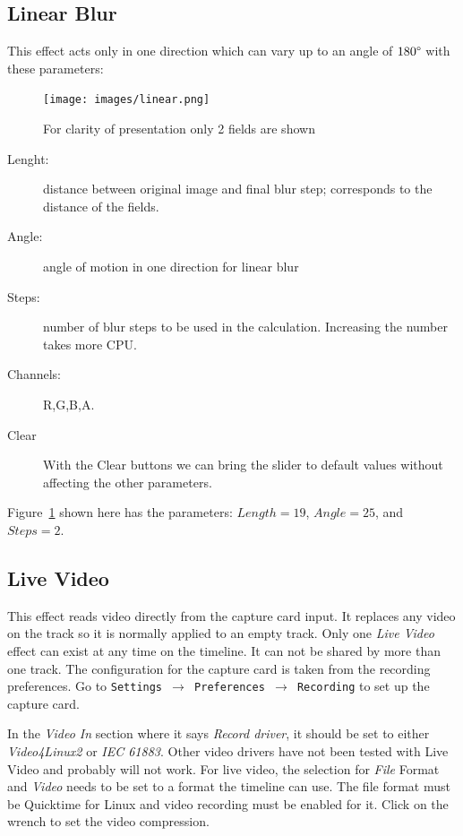 \subsection{Linear Blur}%
\label{sub:linear_blur}

This effect acts only in one direction which can vary up to an angle of $180\degree$ with these parameters:

\begin{figure}[htpb]
	\centering
	\texttt{[image: images/linear.png]}
	\caption{For clarity of presentation only 2 fields are shown}
	\label{fig:linear}
\end{figure}

\begin{description}
    \item[Lenght:] distance between original image and final blur step; corresponds to the distance of the fields.
    \item[Angle:] angle of motion in one direction for linear blur
    \item[Steps:] number of blur steps to be used in the calculation. Increasing the number takes more CPU.
    \item[Channels:] R,G,B,A.
    \item[Clear] With the Clear buttons we can bring the slider to default values without affecting the other parameters.
\end{description}

Figure~\ref{fig:linear} shown here has the parameters: $Length=19$, $Angle=25$, and $Steps=2$.

\subsection{Live Video}%
\label{sub:live_video}

This effect reads video directly from the capture card input. It replaces any video on the track so it is normally applied to an empty track. Only one \textit{Live Video} effect can exist at any time on the timeline. It can not be shared by more than one track. The configuration for the capture card is taken from the recording preferences. Go to \texttt{Settings $\rightarrow$ Preferences $\rightarrow$ Recording} to set up the capture card.

In the \textit{Video In} section where it says \textit{Record driver}, it should be set to either \textit{Video4Linux2} or \textit{IEC 61883}. Other video drivers have not been tested with Live Video and probably will not work. For live video, the selection for \textit{File} Format and \textit{Video} needs to be set to a format the timeline can use. The file format must be Quicktime for Linux and video recording must be enabled for it. Click on the wrench to set the video compression.

